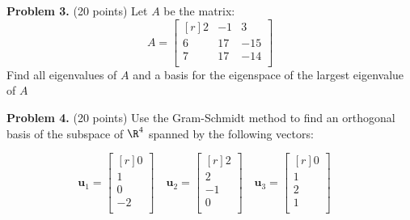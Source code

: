 \documentclass[12pt]{article}
\begin{document}
\clearpage


\textbf{Problem 3.} (20 points) 
Let $A$ be the matrix:
\[A=
\begin{bmatrix*}[r]2&-1&3\\6&17&-15\\7&17&-14\\\end{bmatrix*}
\]
Find all eigenvalues of $A$ and a basis for the eigenspace of the largest eigenvalue of $A$



\clearpage

\textbf{Problem 4.} (20 points)
Use the Gram-Schmidt method to find an orthogonal basis of the subspace 
of $\R^{4}$ spanned by the following vectors:

\[
\mathbf{u}_1=\begin{bmatrix*}[r]0\\ 1\\ 0\\ -2\\ \end{bmatrix*}\quad
\mathbf{u}_2=\begin{bmatrix*}[r]2\\ 2\\ -1\\ 0\\ \end{bmatrix*}\quad
\mathbf{u}_3=\begin{bmatrix*}[r]0\\ 1\\ 2\\ 1\\ \end{bmatrix*}\quad
\]

\end{document}
